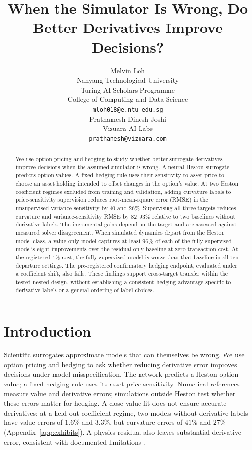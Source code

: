 \documentclass{article}
\title{When the Simulator Is Wrong, Do Better Derivatives Improve Decisions?}
\author{%
  Melvin Loh \\
  Nanyang Technological University \\
  Turing AI Scholars Programme \\
  College of Computing and Data Science \\
  \texttt{mloh018@e.ntu.edu.sg} \\
  \And
  Prathamesh Dinesh Joshi \\
  Vizuara AI Labs \\
  \texttt{prathamesh@vizuara.com} \\
}
\begin{document}
\maketitle

\begin{abstract}
We use option pricing and hedging to study whether better surrogate derivatives
improve decisions when the assumed simulator is wrong. A neural Heston surrogate
predicts option values. A fixed hedging rule uses their sensitivity to asset price
to choose an asset holding intended to offset changes in the option's value.
At two Heston coefficient regimes excluded from training and validation,
adding curvature labels to price-sensitivity supervision reduces root-mean-square
error (RMSE) in the unsupervised variance sensitivity by $40$ and $26\%$.
Supervising all three targets reduces curvature and variance-sensitivity RMSE by
$82$--$93\%$ relative to two baselines without derivative labels. The incremental
gains depend on the target and are assessed against measured solver disagreement.
When simulated dynamics depart from the Heston model class, a value-only model
captures at least $96\%$ of each of the fully supervised model's eight improvements
over the residual-only baseline at zero transaction cost. At the registered $1\%$
cost, the fully supervised model is worse than that baseline in all ten departure
settings. The pre-registered confirmatory hedging endpoint, evaluated under a
coefficient shift, also fails. These findings support cross-target transfer within
the tested nested design, without establishing a consistent hedging advantage
specific to derivative labels or a general ordering of label choices.
\end{abstract}

\section{Introduction}
\label{sec:intro}

Scientific surrogates approximate models that can themselves be wrong. We use
option pricing and hedging to ask whether reducing derivative error improves
decisions under model misspecification. The network predicts a Heston option value;
a fixed hedging rule uses its asset-price sensitivity. Numerical references measure
value and derivative errors; simulations outside Heston test whether these errors
matter for hedging.
A close value fit does not ensure accurate derivatives: at a held-out coefficient
regime, two models without derivative labels have value errors of $1.6\%$ and
$3.3\%$, but curvature errors of $41\%$ and $27\%$
(Appendix~\ref{app:exhibits}). A physics residual also leaves substantial derivative
error, consistent with documented limitations
\citep{krishnapriyan2021characterizing,wang2021understanding}.
\end{document}
